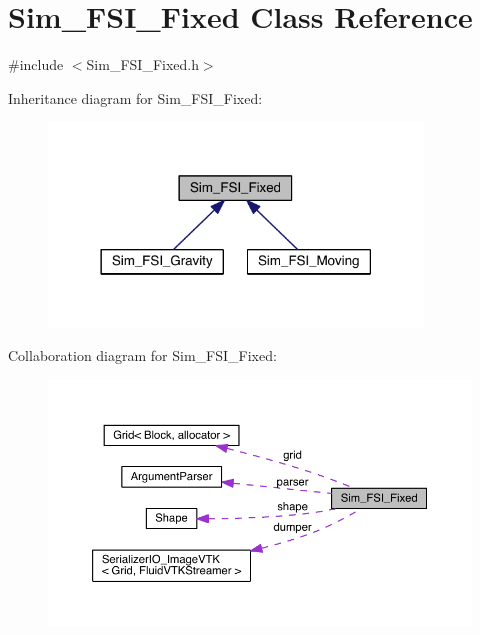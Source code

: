 \hypertarget{class_sim___f_s_i___fixed}{}\section{Sim\+\_\+\+F\+S\+I\+\_\+\+Fixed Class Reference}
\label{class_sim___f_s_i___fixed}


{\ttfamily \#include $<$Sim\+\_\+\+F\+S\+I\+\_\+\+Fixed.\+h$>$}



Inheritance diagram for Sim\+\_\+\+F\+S\+I\+\_\+\+Fixed\+:\nopagebreak
\begin{figure}[H]
\begin{center}
\leavevmode
\includegraphics[width=282pt]{da/d05/class_sim___f_s_i___fixed__inherit__graph}
\end{center}
\end{figure}


Collaboration diagram for Sim\+\_\+\+F\+S\+I\+\_\+\+Fixed\+:\nopagebreak
\begin{figure}[H]
\begin{center}
\leavevmode
\includegraphics[width=350pt]{dc/d0c/class_sim___f_s_i___fixed__coll__graph}
\end{center}
\end{figure}
